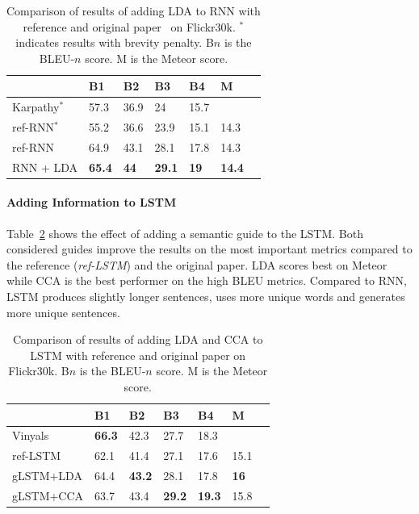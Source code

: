 \documentclass[twoside,twocolumn]{article}
\begin{document}
	\begin{table}
		\centering
		\begin{tabular}{lllllll}
			& B1 & B2 & B3 & B4 & M \\ \hline
			Karpathy$^*$~\cite{Karpathy2015}    & 57.3   & 36.9   & 24     & 15.7   & ~           \\    
			ref-RNN$^*$     & 55.2   & 36.6   & 23.9   & 15.1   & 14.3          \\
			ref-RNN          & 64.9  & 43.1     & 28.1   & 17.8   & 14.3          \\
			RNN + LDA         & \textbf{65.4}   & \textbf{44}     & \textbf{29.1}   & \textbf{19}     & \textbf{14.4}          \\\hline
		\end{tabular}
		\caption{Comparison of results of adding LDA to RNN with reference and original paper~\cite{Karpathy2015} on Flickr30k. $^{*}$ indicates results with brevity penalty. B$n$ is the BLEU-$n$ score. M is the Meteor score.}
		\label{table:results_rnn}
	\end{table}
	
	\paragraph{Adding Information to LSTM}
	Table~\ref{table:results_lstm} shows the effect of adding a semantic guide to the LSTM. Both considered guides improve the results on the most important metrics compared to the reference (\emph{ref-LSTM}) and the original paper. LDA scores best on Meteor while CCA is the best performer on the high BLEU metrics. Compared to RNN, LSTM produces slightly longer sentences, uses more unique words and generates more unique sentences.
	\begin{table}
		\centering
		\begin{tabular}{lllllll}
			& B1 & B2 & B3 & B4 & M \\ \hline
			Vinyals~\cite{Google}      & \textbf{66.3}   & 42.3   & 27.7   & 18.3   & ~     \\ 
			ref-LSTM         & 62.1   & 41.4   & 27.1   & 17.6   & 15.1  \\
			gLSTM+LDA         & 64.4   & \textbf{43.2}   & 28.1   & 17.8   & \textbf{16}  \\
			gLSTM+CCA         & 63.7   & 43.4   & \textbf{29.2}   &\textbf{19.3}   & 15.8  \\ \hline
		\end{tabular}
		\caption{Comparison of results of adding LDA and CCA to LSTM with reference and original paper on Flickr30k. B$n$ is the BLEU-$n$ score. M is the Meteor score.}
		\label{table:results_lstm}
	\end{table}
	
\end{document}
